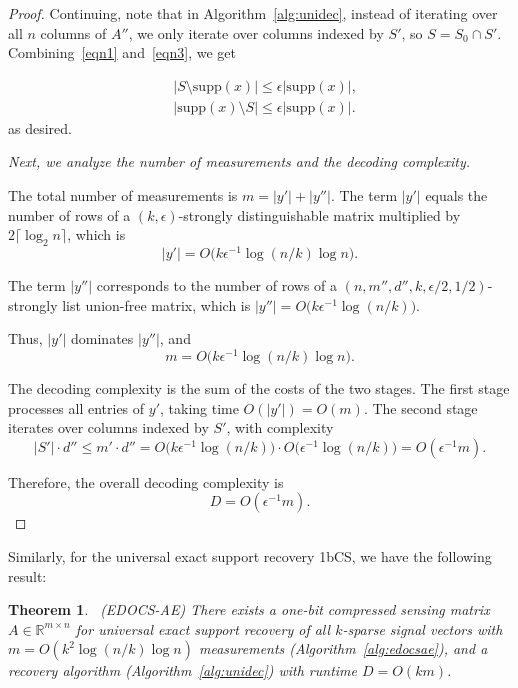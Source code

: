 \documentclass{article}
\newtheorem{theorem}{Theorem}[subsection]
\newcommand{\supp}{\mathrm{supp}}
\begin{document}
\begin{proof}
Continuing, note that in Algorithm~\ref{alg:unidec}, instead of iterating over all $n$ columns of $A''$, we only iterate over columns indexed by $S'$, so $S = S_0 \cap S'$. Combining~\eqref{eqn1} and~\eqref{eqn3}, we get

\begin{equation*}
\begin{aligned}
    & |S \setminus \supp(x)| \leq \epsilon|\supp(x)|, \\
    & |\supp(x) \setminus S| \leq \epsilon|\supp(x)|.
\end{aligned}
\end{equation*}
as desired.

\emph{Next, we analyze the number of measurements and the decoding complexity.}

The total number of measurements is $m = |y'| + |y''|$. The term $|y'|$ equals the number of rows of a $(k,\epsilon)$-strongly distinguishable matrix multiplied by $2\lceil \log_2 n \rceil$, which is
\[
|y'| = O\bigl(k\epsilon^{-1}\log(n/k)\log n\bigr).
\]

The term $|y''|$ corresponds to the number of rows of a $(n,m'',d'',k,\epsilon/2,1/2)$-strongly list union-free matrix, which is
\(
|y''| = O\bigl(k\epsilon^{-1}\log(n/k)\bigr).
\)

Thus, $|y'|$ dominates $|y''|$, and
\[
m = O\bigl(k\epsilon^{-1}\log(n/k)\log n\bigr).
\]

The decoding complexity is the sum of the costs of the two stages. The first stage processes all entries of $y'$, taking time $O(|y'|)=O(m)$. The second stage iterates over columns indexed by $S'$, with complexity
\[
|S'| \cdot d'' \leq m' \cdot d'' 
= O\bigl(k\epsilon^{-1}\log(n/k)\bigr)\cdot O\bigl(\epsilon^{-1}\log(n/k)\bigr)= O(\epsilon^{-1} m).\]


Therefore, the overall decoding complexity is
\[
D = O(\epsilon^{-1} m).
\]
\end{proof}

Similarly, for the universal exact support recovery 1bCS, we have the following result:  
\begin{theorem}~\label{thm:ae}
    \emph{(EDOCS-AE)} There exists a one-bit compressed sensing matrix $A\in\mathbb{R}^{m\times n}$ for universal exact support recovery of all $k$-sparse signal vectors with $m=O(k^2\log(n/k)\log n)$ measurements (Algorithm~\ref{alg:edocsae}), and a recovery algorithm (Algorithm~\ref{alg:unidec}) with runtime $D=O(km)$. 
\end{theorem}
\end{document}

